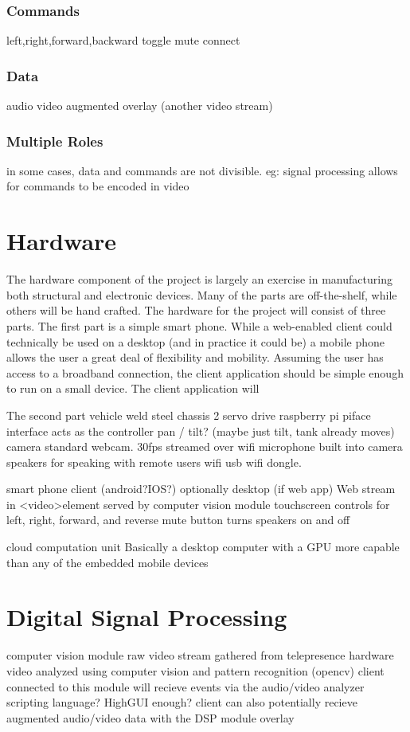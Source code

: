 \documentclass[a4paper,12pt]{report}
\begin{document}
		\subsubsection{Commands}
			left,right,forward,backward
			toggle mute
			connect
		\subsubsection{Data}
			audio
			video
			augmented overlay (another video stream)
		\subsubsection{Multiple Roles}
			in some cases, data and commands are not divisible. eg: signal processing allows for commands to be encoded in video

\section{Hardware}
	The hardware component of the project is largely an exercise in manufacturing both structural and electronic devices. Many of the parts are off-the-shelf, while others will be hand crafted. The hardware for the project will consist of three parts. The first part is a simple smart phone. While a web-enabled client could technically be used on a desktop (and in practice it could be) a mobile phone allows the user a great deal of flexibility and mobility. Assuming the user has access to a broadband connection, the client application should be simple enough to run on a small device. The client application will 

	The second part
	vehicle
		weld steel chassis
		2 servo drive
			raspberry pi piface interface acts as the controller
			pan / tilt? (maybe just tilt, tank already moves)
		camera
			standard webcam. 30fps streamed over wifi
		microphone
			built into camera
		speakers
			for speaking with remote users
		wifi
			usb wifi dongle.

	smart phone client (android?IOS?) optionally desktop (if web app)
		Web stream in \textless video\textgreater element served by computer vision module
		touchscreen controls for left, right, forward, and reverse
		mute button turns speakers on and off
	
	cloud computation unit
		Basically a desktop computer with a GPU more capable than any of the embedded mobile devices
	
\section{Digital Signal Processing}
	computer vision module
	raw video stream gathered from telepresence hardware
	video analyzed using computer vision and pattern recognition (opencv)
	client connected to this module will recieve events via the audio/video analyzer
		scripting language? HighGUI enough?
	client can also potentially recieve augmented audio/video data with the DSP module overlay
	



\end{document}

